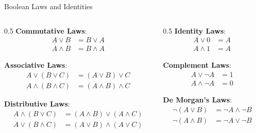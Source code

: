 \documentclass[aspectratio=169,11pt]{beamer}
\newcommand{\concept}[1]{\textbf{\color{accentcolor}#1}}
\begin{document}
\begin{frame}{Boolean Laws and Identities}
\begin{columns}
\begin{column}{0.5\textwidth}
\concept{Commutative Laws}:
\begin{align}
A \lor B &= B \lor A\\
A \land B &= B \land A
\end{align}

\concept{Associative Laws}:
\begin{align}
A \lor (B \lor C) &= (A \lor B) \lor C\\
A \land (B \land C) &= (A \land B) \land C
\end{align}

\concept{Distributive Laws}:
\begin{align}
A \land (B \lor C) &= (A \land B) \lor (A \land C)\\
A \lor (B \land C) &= (A \lor B) \land (A \lor C)
\end{align}
\end{column}
\begin{column}{0.5\textwidth}
\concept{Identity Laws}:
\begin{align}
A \lor 0 &= A\\
A \land 1 &= A
\end{align}

\concept{Complement Laws}:
\begin{align}
A \lor \neg A &= 1\\
A \land \neg A &= 0
\end{align}

\concept{De Morgan's Laws}:
\begin{align}
\neg(A \lor B) &= \neg A \land \neg B\\
\neg(A \land B) &= \neg A \lor \neg B
\end{align}
\end{column}
\end{columns}
\end{frame}
\end{document}
